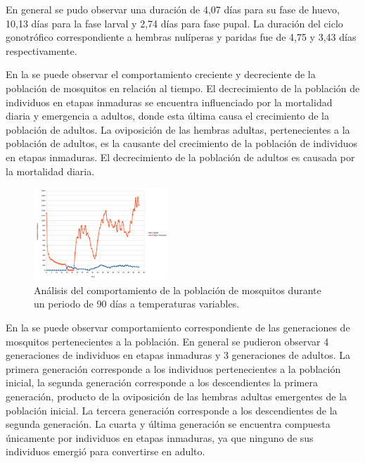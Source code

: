 En general se pudo observar una duración de 4,07 días para su fase de huevo, 10,13 días para la
fase larval y 2,74 días para fase pupal. La duración del ciclo gonotrófico correspondiente a
hembras nulíperas y paridas fue de 4,75 y 3,43 días respectivamente.

En la  se puede observar el comportamiento creciente y decreciente
de la población de mosquitos en relación al tiempo. El decrecimiento de la población de individuos
en etapas inmaduras se encuentra influenciado por la mortalidad diaria y emergencia a adultos,
donde esta última causa el crecimiento de la población de adultos. La oviposición de las hembras
adultas, pertenecientes a la población de adultos, es la causante del crecimiento de la población
de individuos en etapas inmaduras. El decrecimiento de la población de adultos es causada por la
mortalidad diaria.

\begin{figure}[!htbp]
    \centering
    \includegraphics[width=0.45\textwidth]{../book/capitulo-6/graphics/temp-var-90-poblacion.png}
    \caption{\label{fig:temp-var-poblacion} Análisis del comportamiento de la población de mosquitos durante un periodo de 90 días a temperaturas variables.}
\end{figure}

En la  se puede observar comportamiento correspondiente de las
generaciones de mosquitos pertenecientes a la población. En general se pudieron observar 4
generaciones de individuos en etapas inmaduras y 3 generaciones de adultos. La primera generación
corresponde a los individuos pertenecientes a la población inicial, la segunda generación
corresponde a los descendientes la primera generación, producto de la oviposición de las hembras
adultas emergentes de la población inicial. La tercera generación corresponde a los descendientes
de la segunda generación. La cuarta y última generación se encuentra compuesta únicamente por
individuos en etapas inmaduras, ya que ninguno de sus individuos emergió para convertirse en adulto.

